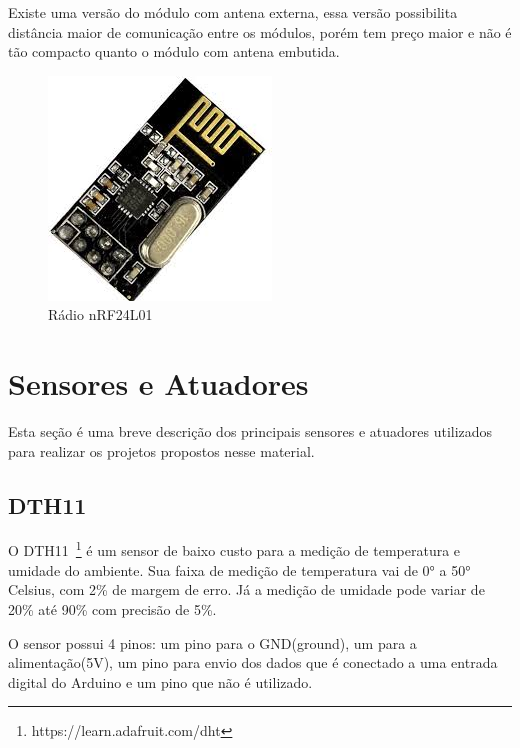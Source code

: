 Existe uma versão do módulo com antena externa, essa versão possibilita distância maior de comunicação entre os módulos, porém tem preço maior e não é tão compacto quanto o módulo com antena embutida. 

\begin{figure}[ht]
      \centering
      \includegraphics[scale=0.30]{figuras/nrf24l01.jpg}
      \caption{Rádio nRF24L01}
      \label{fig:nRF24L01}
\end{figure}



\section{Sensores e Atuadores}

Esta seção é uma breve descrição dos principais sensores e atuadores utilizados para realizar os projetos propostos nesse material.  

\subsection{DTH11}

O DTH11~\footnote{https://learn.adafruit.com/dht} é um sensor de baixo custo para a medição de temperatura e umidade do ambiente. Sua faixa de medição de temperatura vai de 0° a 50° Celsius, com 2\% de margem de erro. Já a medição de umidade pode variar de 20\% até 90\% com precisão de 5\%.

O sensor possui 4 pinos: um pino para o GND(ground), um para a alimentação(5V), um pino para envio dos dados que é conectado a uma entrada digital do Arduino e um pino que não é utilizado.

